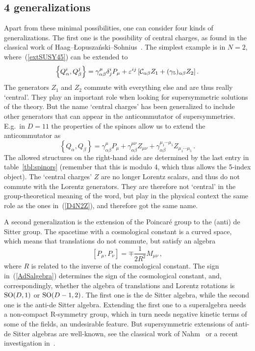 \documentclass[a4paper,11pt,twoside]{article}
\newcommand{\Red}[1]{#1}
\newcommand{\OliveGreen}[1]{#1}
\newcommand{\Blue}[1]{#1}
\newcommand{\SO}{\mathop{\rm SO}}
\begin{document}
\subsection{4 generalizations}
Apart from these minimal possibilities, one can consider four kinds of
generalizations. The first one is the possibility of central charges, as
found in the classical work of
Haag--{\L}opusza\'nski--Sohnius~\cite{Haag:1975qh}. The simplest example
is in $N=2$, where~(\ref{extSUSY45}) can be extended to
\begin{equation}
  \left\{ \Blue{Q}^i_\alpha ,\Blue{Q}^j_\beta \right\} =
  \gamma ^\mu
_{\alpha \beta }\delta ^i_j\OliveGreen{P_\mu
  }+\varepsilon ^{ij}\left[ {\cal C}_{\alpha \beta }\Red{Z_1}+
  (\gamma _5)_{\alpha \beta }\Red{Z_2}\right].
 \label{D4N2Z}
\end{equation}
The generators $Z_1$ and $Z_2$ commute with everything else and are thus
really `central'. They play an important role when looking for
supersymmetric solutions of the theory. But the name `central charges'
has been generalized to include other generators that can appear in the
anticommutator of supersymmetries. E.g.\ in $D=11$ the properties of the
spinors allow us to extend the anticommutator as~\cite{vanHolten:1982mx}
\begin{equation}
  \left\{\Blue{Q}_\alpha ,\Blue{Q}_\beta  \right\}=\gamma^\mu _{\alpha \beta } \OliveGreen{P}_\mu
+\gamma ^{\mu \nu } _{\alpha \beta }\Red{Z}_{\mu \nu }+\gamma
^{\mu_1\cdots \mu_5 } _{\alpha \beta }\Red{Z}_{\mu_1\cdots \mu_5 }\,.
 \label{QQD11}
\end{equation}
The allowed structures on the right-hand side are determined by the last
entry in table~\ref{tbl:spinors} (remember that this is modulo 4, which
thus allows the 5-index object). The `central charges' $\Red{Z}$ are no
longer Lorentz scalars, and thus do not commute with the Lorentz
generators. They are therefore not `central' in the group-theoretical
meaning of the word, but play in the physical context the same role as
the ones in~(\ref{D4N2Z}), and therefore got the same name.

A second generalization is the extension of the Poincar{\'e} group to the
(anti) de Sitter group. The spacetime with a cosmological constant is a
curved space, which means that translations do not commute, but satisfy
an algebra
\begin{equation}
  \left[ \OliveGreen{P_\mu },\OliveGreen{P_\nu }\right] =\mp \frac{1}{2R^2}\OliveGreen{M_{\mu \nu
  }}\,,
 \label{AdSalgebra}
\end{equation}
where $R$ is related to the inverse of the cosmological constant. The
sign in~(\ref{AdSalgebra}) determines the sign of the cosmological
constant, and, correspondingly, whether the algebra of translations and
Lorentz rotations is $\SO(D,1)$ or $\SO(D-1,2)$. The first one is the de
Sitter algebra, while the second one is the anti-de Sitter algebra.
Extending the first one to a superalgebra needs a non-compact R-symmetry
group, which in turn needs negative kinetic terms of some of the fields,
an undesirable feature. But supersymmetric extensions of anti-de Sitter
algebras are well-known, see the classical work of
Nahm~\cite{Nahm:1978tg} or a recent investigation
in~\cite{D'Auria:2000ec}.
\end{document}
